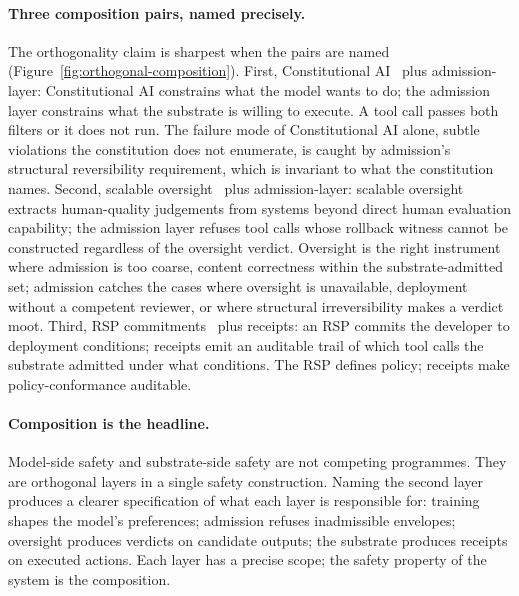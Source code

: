 \paragraph{Three composition pairs, named precisely.}
The orthogonality claim is sharpest when the pairs are named (Figure~\ref{fig:orthogonal-composition}). First, Constitutional AI~\cite{baiConstitutionalAI2022} plus admission-layer: Constitutional AI constrains what the model wants to do; the admission layer constrains what the substrate is willing to execute. A tool call passes both filters or it does not run. The failure mode of Constitutional AI alone, subtle violations the constitution does not enumerate, is caught by admission's structural reversibility requirement, which is invariant to what the constitution names. Second, scalable oversight~\cite{leikeScalableOversight2018,christianoDebate2018,bowmanScalableOversight2022} plus admission-layer: scalable oversight extracts human-quality judgements from systems beyond direct human evaluation capability; the admission layer refuses tool calls whose rollback witness cannot be constructed regardless of the oversight verdict. Oversight is the right instrument where admission is too coarse, content correctness within the substrate-admitted set; admission catches the cases where oversight is unavailable, deployment without a competent reviewer, or where structural irreversibility makes a verdict moot. Third, RSP commitments~\cite{anthropicRSP2023} plus receipts: an RSP commits the developer to deployment conditions; receipts emit an auditable trail of which tool calls the substrate admitted under what conditions. The RSP defines policy; receipts make policy-conformance auditable.

\paragraph{Composition is the headline.}
Model-side safety and substrate-side safety are not competing programmes. They are orthogonal layers in a single safety construction. Naming the second layer produces a clearer specification of what each layer is responsible for: training shapes the model's preferences; admission refuses inadmissible envelopes; oversight produces verdicts on candidate outputs; the substrate produces receipts on executed actions. Each layer has a precise scope; the safety property of the system is the composition.
